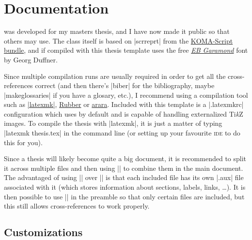 \chapter{Documentation}

 was developed for my masters thesis, and I
have now made it public so that others may use.  The class itself is based on
|scrreprt| from the \href{https://www.ctan.org/pkg/koma-script}{KOMA-Script
  bundle}, and if compiled with \LuaLaTeX{} this thesis template uses the free
\href{http://www.georgduffner.at/ebgaramond/}{\emph{EB Garamond}} font by Georg
Duffner.

Since multiple compilation runs are usually required in order to get all the
cross-references correct (and then there's |biber| for the bibliography, maybe
|makeglossaries| if you have a glosary, etc.), I recommend using a compilation
tool such as \href{https://www.ctan.org/pkg/latexmk}{|latexmk|},
\href{https://launchpad.net/rubber/}{Rubber} or
\href{https://www.ctan.org/pkg/arara}{arara}.  Included with this template is a
|.latexmkrc| configuration which uses \LuaLaTeX{} by default and is capable of
handling externalized Ti\emph{k}Z images.  To compile the thesis with |latexmk|,
it is just a matter of typing |latexmk thesis.tex| in the command line (or
setting up your favourite \textsc{ide} to do this for you).

Since a thesis will likely become quite a big document, it is recommended to
split it across multiple files and then using || to combine them in the
main document.  The advantaged of using || over || is that each
included file has its own |.aux| file associated with it (which stores
information about sections, labels, links, \dots).  It is then possible to use
|| in the preamble so that only certain files are included, but this
still allows cross-references to work properly.



\section{Customizations}
\label{sec:customizations}

